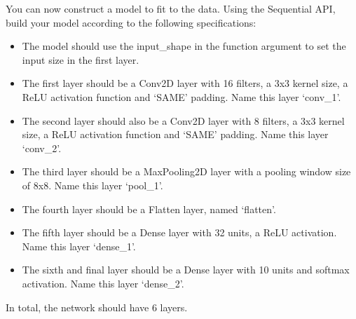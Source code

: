 \documentclass[11pt]{article}
\providecommand{\tightlist}{%
      \setlength{\itemsep}{0pt}\setlength{\parskip}{0pt}}
\begin{document}
    You can now construct a model to fit to the data. Using the Sequential
API, build your model according to the following specifications:

\begin{itemize}
\tightlist
\item
  The model should use the input\_shape in the function argument to set
  the input size in the first layer.
\item
  The first layer should be a Conv2D layer with 16 filters, a 3x3 kernel
  size, a ReLU activation function and `SAME' padding. Name this layer
  `conv\_1'.
\item
  The second layer should also be a Conv2D layer with 8 filters, a 3x3
  kernel size, a ReLU activation function and `SAME' padding. Name this
  layer `conv\_2'.
\item
  The third layer should be a MaxPooling2D layer with a pooling window
  size of 8x8. Name this layer `pool\_1'.
\item
  The fourth layer should be a Flatten layer, named `flatten'.
\item
  The fifth layer should be a Dense layer with 32 units, a ReLU
  activation. Name this layer `dense\_1'.
\item
  The sixth and final layer should be a Dense layer with 10 units and
  softmax activation. Name this layer `dense\_2'.
\end{itemize}

In total, the network should have 6 layers.
\end{document}

